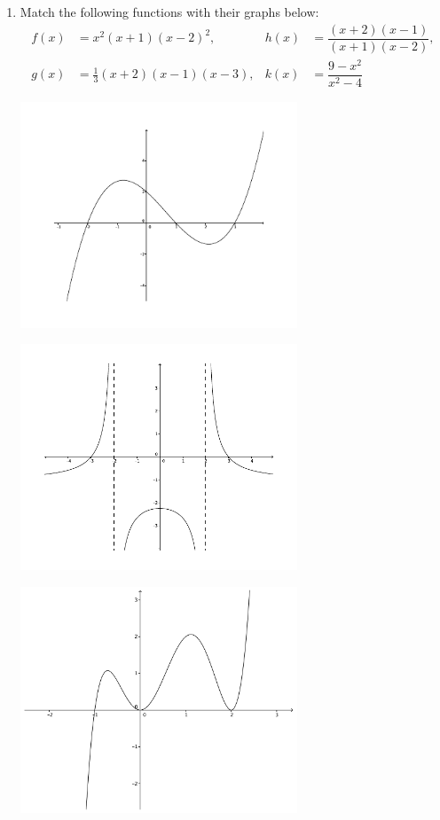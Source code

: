 \documentclass[12pt]{article}
\newcommand{\points}[1]{\marginpar{\hspace{24pt}[#1]}}
\begin{document}
\begin{enumerate}
\item Match the following functions with their graphs below: \points{8}
\begin{align*}
 f(x) &= x^2(x+1)(x-2)^2, &h(x) &= \dfrac{(x+2)(x-1)}{(x+1)(x-2)},\\
 g(x) &= \frac{1}{3}(x+2)(x-1)(x-3), &k(x) &= \dfrac{9-x^2}{x^2-4}
\end{align*}

\bigskip

\begin{multicols}{2}
 \begin{center}
  \includegraphics[width=3.25in]{poly1(b)}
 \end{center}

\bigskip

\bigskip

 \begin{center}
   \includegraphics[width=3.25in]{rat1(d)}
 \end{center}
 \begin{center}
   \includegraphics[width=3.25in]{poly1(d)}
 \end{center}


\end{multicols}
\end{enumerate}
\end{document}
